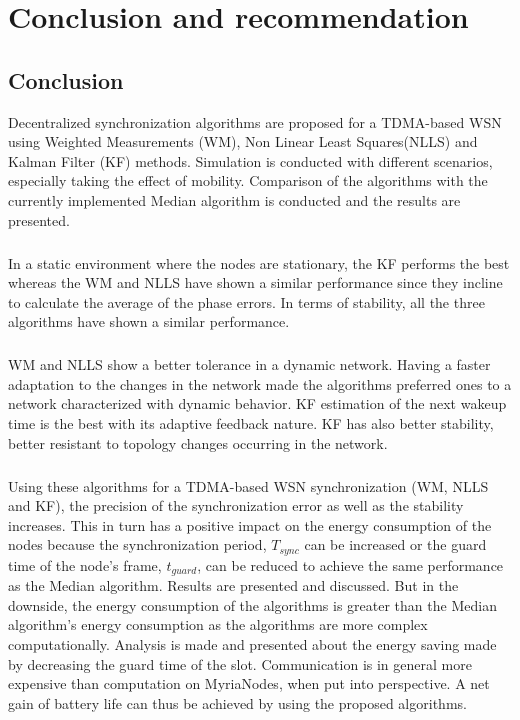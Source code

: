 \documentclass[a4paper,10pt]{report}
\begin{document}
\chapter{\textbf{Conclusion and recommendation}}
\section{\textbf{Conclusion}}
Decentralized synchronization algorithms are proposed for a TDMA-based WSN using Weighted Measurements (WM), Non Linear Least Squares(NLLS) and Kalman Filter (KF) methods. Simulation is conducted with different scenarios, especially taking the effect of mobility. Comparison of the algorithms with the currently implemented Median algorithm is conducted and the results are presented.
\paragraph*{}
In a static environment where the nodes are stationary, the KF performs the best whereas the WM and NLLS have shown a similar performance since they incline to calculate the average of the phase errors. In terms of stability, all the three algorithms have shown a similar performance.
\paragraph*{}
WM and NLLS show a better tolerance in a dynamic network. Having a
faster adaptation to the changes in the network made the algorithms
preferred ones to a network characterized with dynamic behavior. KF
estimation of the next wakeup time is the best with its adaptive feedback nature. KF has also better stability, better
resistant to topology changes occurring in the network.
\paragraph*{}
Using these algorithms for a TDMA-based WSN synchronization (WM, NLLS and KF), the precision of the synchronization error as well as the stability increases. This in turn has a positive impact on the energy consumption of the nodes because the synchronization period, $T_{sync}$ can be increased or the guard time of the node's frame, $t_{guard}$, can be reduced to achieve the same performance as the Median algorithm. Results are presented and discussed. But in the downside, the energy consumption of the algorithms is greater than the Median algorithm's energy consumption as the algorithms are more complex computationally. Analysis is made and presented about the energy saving made by decreasing the guard time of the slot. Communication is in general more expensive than computation on MyriaNodes, when put into perspective. A net gain of battery life can thus be achieved by using the proposed algorithms.
\end{document}

